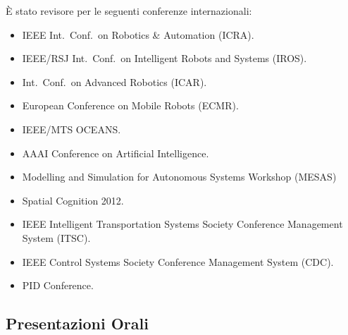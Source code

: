 \documentclass[11pt]{article}
\begin{document}
\noindent \`E stato revisore per le seguenti conferenze internazionali:
\begin{itemize}
\item IEEE Int.~Conf.~on Robotics \& Automation (ICRA).
\item IEEE/RSJ Int.~Conf.~on Intelligent Robots and Systems (IROS).
\item Int.~Conf.~on Advanced Robotics (ICAR).
\item European Conference on Mobile Robots (ECMR). 
\item IEEE/MTS OCEANS. 
\item AAAI Conference on Artificial Intelligence. 
\item Modelling and Simulation for Autonomous Systems Workshop (MESAS)
\item Spatial Cognition 2012.
\item IEEE Intelligent Transportation Systems Society Conference Management System (ITSC).
\item IEEE Control Systems Society Conference Management System (CDC).
\item PID Conference.
\end{itemize}

\subsection*{Presentazioni Orali}
\end{document}

